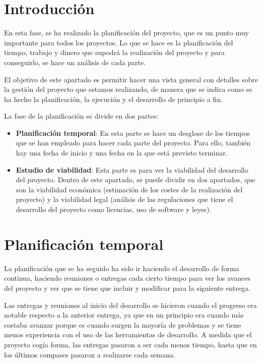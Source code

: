 
\section{Introducción}

En esta fase, se ha realizado la planificación del proyecto, que es un punto muy importante para todos los proyectos. Lo que se hace es la planificación del tiempo, trabajo y dinero que supodrá la realización del proyecto y para conseguirlo, se hace un análisis de cada parte.

El objetivo de este apartado es permitir hacer una vista general con detalles sobre la gestión del proyecto que estamos realizando, de manera que se indica como se ha hecho la planificación, la ejecución y el desarrollo de principio a fin.

La fase de la planificación se divide en dos partes:
\begin{itemize}
\tightlist
\item
  \textbf{Planificación temporal}: En esta parte se hace un desglose de los tiempos que se han empleado para hacer cada parte del proyecto. Para ello, también hay una fecha de inicio y una fecha en la que está previsto terminar.
\item
  \textbf{Estudio de viabilidad}: Esta parte es para ver la viabilidad del desarrollo del proyecto. Dentro de este apartado, se puede dividir en dos apartados, que son la viabilidad económica (estimación de los costes de la realización del proyecto) y la viabilidad legal (análisis de las regulaciones que tiene el desarrollo del proyecto como licencias, uso de software y leyes).
\end{itemize}

\section{Planificación temporal}

La planificación que se ha seguido ha sido ir haciendo el desarrollo de forma continua, haciendo reuniones o entregas cada cierto tiempo para ver los avances del proyecto y ver que se tiene que incluir y modificar para la siguiente entrega.

Las entregas y reuniones al inicio del desarrollo se hicieron cuando el progreso era notable respecto a la anterior entrega, ya que en un principio era cuando más costaba avanzar porque es cuando surgen la mayoría de problemas y se tiene menos experiencia con el uso de las herramientas de desarrollo. A medida que el proyecto cogía forma, las entregas pasaron a ser cada menos tiempo, hasta que en los últimos compases pasaron a realizarse cada semana.

